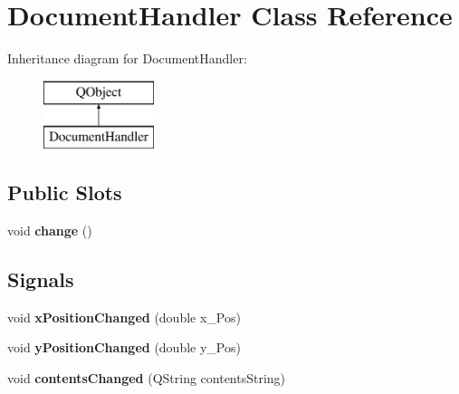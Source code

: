 \hypertarget{classDocumentHandler}{}\section{Document\+Handler Class Reference}
\label{classDocumentHandler}
Inheritance diagram for Document\+Handler\+:\begin{figure}[H]
\begin{center}
\leavevmode
\includegraphics[height=2.000000cm]{classDocumentHandler}
\end{center}
\end{figure}
\subsection*{Public Slots}
\begin{DoxyCompactItemize}
\item 
\mbox{\label{classDocumentHandler_a0ecd6f194d033839ad435774a9e69175}} 
void {\bfseries change} ()
\end{DoxyCompactItemize}
\subsection*{Signals}
\begin{DoxyCompactItemize}
\item 
\mbox{\label{classDocumentHandler_a9c5f6fe67692b2c6eee99ae7db3e800a}} 
void {\bfseries x\+Position\+Changed} (double x\+\_\+\+Pos)
\item 
\mbox{\label{classDocumentHandler_a790ff40edce5b35c6ab2a200b7f91ec2}} 
void {\bfseries y\+Position\+Changed} (double y\+\_\+\+Pos)
\item 
\mbox{\label{classDocumentHandler_a64fdb415e08d69a10b80b75f3e588d69}} 
void {\bfseries contents\+Changed} (Q\+String contents\+String)
\end{DoxyCompactItemize}
